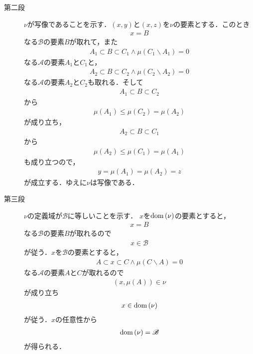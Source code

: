 \begin{sketch}
\begin{description}
				\item[第二段]
					$\nu$が写像であることを示す．$(x,y)$と$(x,z)$を$\nu$の要素とする．このとき
					\begin{align}
						x = B
					\end{align}
					なる$\mathscr{B}$の要素$B$が取れて，また
					\begin{align}
						A_1 \subset B \subset C_1 \wedge \mu(C_1 \backslash A_1)=0
					\end{align}
					なる$\mathscr{A}$の要素$A_1$と$C_1$と，
					\begin{align}
						A_2 \subset B \subset C_2 \wedge \mu(C_2 \backslash A_2)=0
					\end{align}
					なる$\mathscr{A}$の要素$A_2$と$C_2$も取れる．そして
					\begin{align}
						A_1 \subset B \subset C_2
					\end{align}
					から
					\begin{align}
						\mu(A_1) \leq \mu(C_2) = \mu(A_2)
					\end{align}
					が成り立ち，
					\begin{align}
						A_2 \subset B \subset C_1
					\end{align}
					から
					\begin{align}
						\mu(A_2) \leq \mu(C_1) = \mu(A_1)
					\end{align}
					も成り立つので，
					\begin{align}
						y = \mu(A_1) = \mu(A_2) = z
					\end{align}
					が成立する．ゆえに$\nu$は写像である．
					
				\item[第三段] $\nu$の定義域が$\mathscr{B}$に等しいことを示す．
					$x$を$\operatorname*{dom} \left(\nu\right)$の要素とすると，
					\begin{align}
						x = B
					\end{align}
					なる$\mathscr{B}$の要素$B$が取れるので
					\begin{align}
						x \in \mathscr{B}
					\end{align}
					が従う．$x$を$\mathscr{B}$の要素とすると，
					\begin{align}
						A \subset x \subset C \wedge \mu(C \backslash A)=0
					\end{align}
					なる$\mathscr{A}$の要素$A$と$C$が取れるので
					\begin{align}
						(x,\mu(A)) \in \nu
					\end{align}
					が成り立ち
					\begin{align}
						x \in \operatorname*{dom} \left(\nu\right)
					\end{align}
					が従う．$x$の任意性から
					\begin{align}
						\operatorname*{dom} \left(\nu\right) = \mathscr{B}
					\end{align}
					が得られる．
				

\end{description}
\end{sketch}
